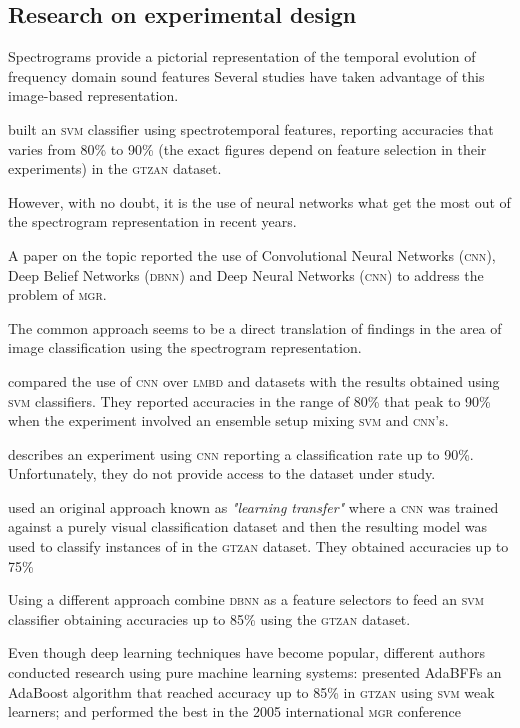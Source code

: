 \subsection{Research on experimental design}

Spectrograms provide a pictorial representation of the temporal evolution of frequency domain sound features \citep{markhandy, 45} Several studies have taken advantage of this image-based representation.

\citet{limetal} built an \textsc{svm} classifier using spectrotemporal features, reporting accuracies that varies from 80\% to 90\% (the exact figures depend on feature selection in their experiments) in the \textsc{gtzan} dataset.


However, with no doubt, it is the use of neural networks what get the most out of the spectrogram representation in recent years.

A paper on the topic \citep{rajana} reported the use of Convolutional Neural Networks (\textsc{cnn}), Deep Belief Networks (\textsc{dbnn}) and Deep Neural Networks (\textsc{cnn}) to address the problem of \textsc{\textsc{mgr}}.

The common approach seems to be a direct translation of findings in the area of image classification using the spectrogram representation.

\citet{costaoliveira} compared the use of \textsc{cnn} over \textsc{lmbd} and \citet{ismir} datasets with the results obtained using \textsc{svm} classifiers. They reported accuracies in the range of 80\% that peak to 90\% when the experiment involved an ensemble setup mixing \textsc{svm} and \textsc{cnn}’s.

\citet{costavalle} describes an experiment using \textsc{cnn} reporting a classification rate up to 90\%. Unfortunately, they do not provide access to the dataset under study.

\citet{gardis} used an original approach known as {\it "learning transfer"} where a \textsc{cnn} was trained against a purely visual classification dataset \citep{lsvrc} and then the resulting model was used to classify instances of in the \textsc{gtzan} dataset. They obtained accuracies up to 75\%

Using a different approach \citet{hamel} combine \textsc{dbnn} as a feature selectors to feed an \textsc{svm} classifier obtaining accuracies up to 85\% using the \textsc{gtzan} dataset.

Even though deep learning techniques have become popular, different authors conducted research using pure machine learning systems: \citet{bergstra} presented AdaBFFs an AdaBoost algorithm that reached accuracy up to 85\% in \textsc{gtzan} using \textsc{svm} weak learners; and performed the best in the 2005 international \textsc{\textsc{mgr}} conference \citet{mirex}

